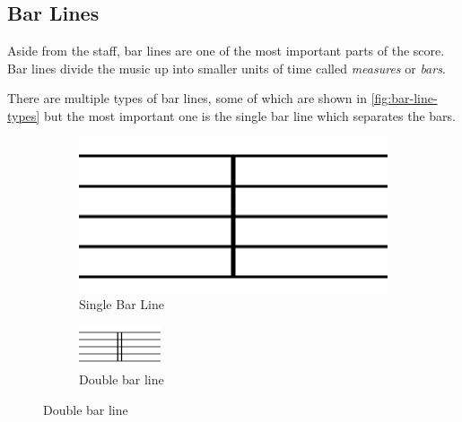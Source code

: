 \subsection{Bar Lines}

Aside from the staff, bar lines are one of the most important parts of the score. Bar lines divide the music up into smaller units of time called \emph{measures} or \emph{bars}.

There are multiple types of bar lines, some of which are shown in \cref{fig:bar-line-types} but the most important one is the single bar line which separates the bars.

\begin{figure}[H]
  \centering

  \begin{subfigure}[b]{.2\linewidth}
      \centering
      \includegraphics[width=\linewidth]{gfx/music-theory/barline-single.png}
      \caption{Single Bar Line}
      \label{fig:single-bar-line}
  \end{subfigure}
  \begin{subfigure}[b]{.2\linewidth}
      \centering
      \includegraphics[width=\linewidth]{gfx/music-theory/barline-double.png}
      \caption{Double bar line}
      \label{fig:double-bar-line}

\end{subfigure}
\end{figure}
